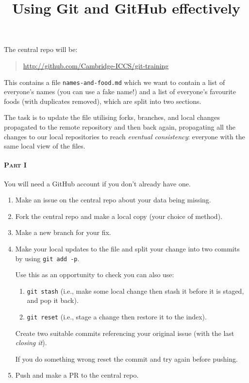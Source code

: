 \documentclass[a4paper]{article}
\title{Using Git and GitHub effectively}
\date{}
\begin{document}
\vspace{-4em}
\maketitle
\vspace{-2em}

\noindent
The central repo will be:

\begin{quote}
\url{http://github.com/Cambridge-ICCS/git-training}
\end{quote}

This contains a file \texttt{names-and-food.md} which we want to contain a list of everyone's names (you can use a fake name!) and a list of everyone's favourite foods (with duplicates removed), which are split into two sections.

The task is to update the file utilising forks, branches, and local changes propagated to the remote repository and then back again, propagating all the changes to our local repositories to reach \emph{eventual consistency}: everyone with the same local view of the files.

\paragraph{ \textsc{Part I}} You will need a GitHub account if you don't
already have one.

\begin{enumerate}
\item Make an issue on the central repo about your data being missing.
\item Fork the central repo and make a local copy (your choice of method).
\item Make a new branch for your fix.
\item Make your local updates to the file and split your change into two commits by using \texttt{git add -p}.

Use this as an opportunity to check you can also use:

\begin{enumerate}
\item \texttt{git stash} (i.e., make some local change then stash it
before it is staged, and pop it back).
\item \texttt{git reset} (i.e., stage a change then restore it to the index).
\end{enumerate}

Create two suitable commits referencing your original issue (with
the last \emph{closing it}).

If you do something wrong reset the commit and try again before pushing.

\item Push and make a PR to the central repo.
\end{enumerate}
\end{document}

